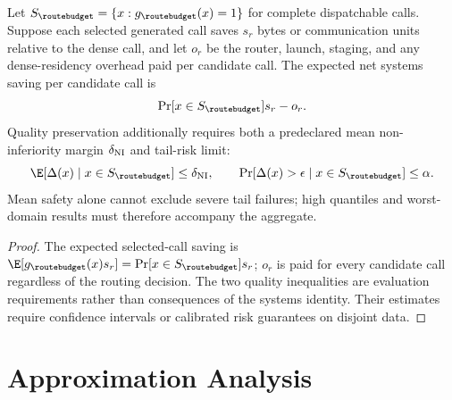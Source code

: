 \begin{proposition}
\label{prop:budget}
Let $S_{\routebudget}=\{x:g_{\routebudget}(x)=1\}$ for complete dispatchable
calls. Suppose each selected generated call saves $s_r$ bytes or communication
units relative to the dense call, and let $o_r$ be the router, launch, staging,
and any dense-residency overhead paid per candidate call. The expected net
systems saving per candidate call is
\begin{equation}
\Pr[x\in S_{\routebudget}]s_r-o_r.
\end{equation}
Quality preservation additionally requires both a predeclared mean
non-inferiority margin $\delta_{\rm NI}$ and tail-risk limit:
\begin{equation}
\E[\Delta(x)\mid x\in S_{\routebudget}]\le\delta_{\rm NI},\qquad
\Pr[\Delta(x)>\epsilon\mid x\in S_{\routebudget}]\le\alpha.
\end{equation}
Mean safety alone cannot exclude severe tail failures; high quantiles and
worst-domain results must therefore accompany the aggregate.
\end{proposition}
\begin{proof}
The expected selected-call saving is
$\E[g_{\routebudget}(x)s_r]=\Pr[x\in S_{\routebudget}]s_r$; $o_r$ is paid for
every candidate call regardless of the routing decision. The two quality
inequalities are evaluation requirements rather than consequences of the
systems identity.  Their estimates require confidence intervals or calibrated
risk guarantees on disjoint data.
\end{proof}

\section{Approximation Analysis}
\label{app:approx}

